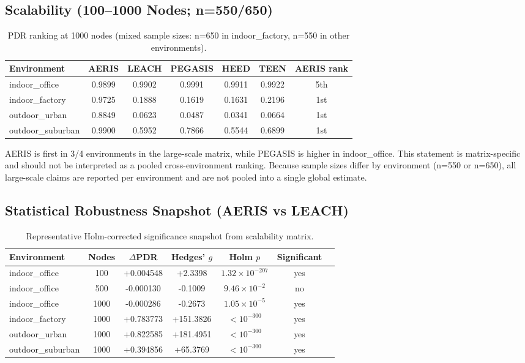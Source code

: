 \documentclass[sensors,article,submit,moreauthors,pdftex]{Definitions/mdpi}
\begin{document}
\subsection{Scalability (100--1000 Nodes; n=550/650)}
\begin{table}[H]
\caption{PDR ranking at 1000 nodes (mixed sample sizes: n=650 in indoor\_factory, n=550 in other environments).}
\label{tab:scale1000}
\centering
\begin{tabular}{lcccccc}
\toprule
Environment & AERIS & LEACH & PEGASIS & HEED & TEEN & AERIS rank \\
\midrule
indoor\_office    & 0.9899 & 0.9902 & 0.9991 & 0.9911 & 0.9922 & 5th \\
indoor\_factory   & 0.9725 & 0.1888 & 0.1619 & 0.1631 & 0.2196 & 1st \\
outdoor\_urban    & 0.8849 & 0.0623 & 0.0487 & 0.0341 & 0.0664 & 1st \\
outdoor\_suburban & 0.9900 & 0.5952 & 0.7866 & 0.5544 & 0.6899 & 1st \\
\bottomrule
\end{tabular}
\end{table}

AERIS is first in 3/4 environments in the large-scale matrix, while PEGASIS is higher in indoor\_office. This statement is matrix-specific and should not be interpreted as a pooled cross-environment ranking.
Because sample sizes differ by environment (n=550 or n=650), all large-scale claims are reported per environment and are not pooled into a single global estimate.

\subsection{Statistical Robustness Snapshot (AERIS vs LEACH)}
\begin{table}[H]
\caption{Representative Holm-corrected significance snapshot from scalability matrix.}
\label{tab:robust_snapshot}
\centering
\begin{tabular}{lcccccc}
\toprule
Environment & Nodes & $\Delta$PDR & Hedges' $g$ & Holm $p$ & Significant \\
\midrule
indoor\_office    & 100  & +0.004548 & +2.3398 & $1.32\times10^{-207}$ & yes \\
indoor\_office    & 500  & -0.000130 & -0.1009 & $9.46\times10^{-2}$ & no \\
indoor\_office    & 1000 & -0.000286 & -0.2673 & $1.05\times10^{-5}$ & yes \\
indoor\_factory   & 1000 & +0.783773 & +151.3826 & $<10^{-300}$ & yes \\
outdoor\_urban    & 1000 & +0.822585 & +181.4951 & $<10^{-300}$ & yes \\
outdoor\_suburban & 1000 & +0.394856 & +65.3769 & $<10^{-300}$ & yes \\
\bottomrule
\end{tabular}
\end{table}
\end{document}

